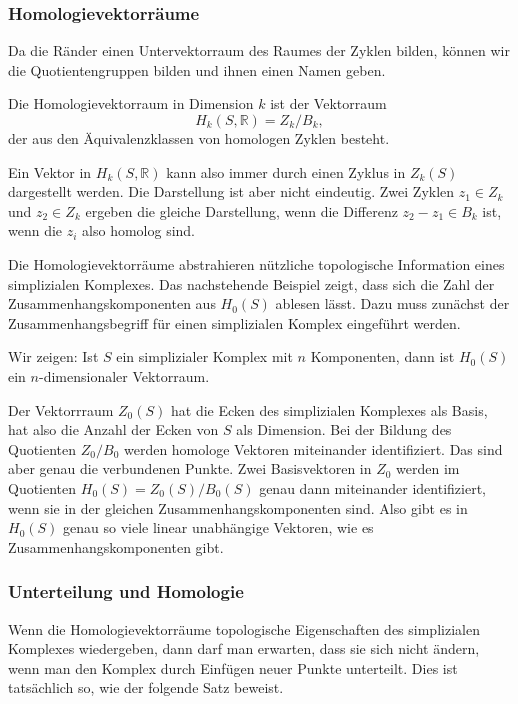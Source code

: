 %
%
\subsubsection{Homologievektorräume}
Da die Ränder einen Untervektorraum des Raumes der Zyklen bilden,
können wir die Quotientengruppen bilden und ihnen einen Namen geben.

\begin{definition}[Homologievektorraum]
Die Homologievektorraum in Dimension $k$ ist der Vektorraum
\[
H_k(S,\mathbb{R})
=
Z_k / B_k,
\]
der aus den Äquivalenzklassen von homologen Zyklen besteht.
\end{definition}

Ein Vektor in $H_k(S,\mathbb{R})$ kann also immer durch einen Zyklus
in $Z_k(S)$ dargestellt werden.
Die Darstellung ist aber nicht eindeutig.
Zwei Zyklen $z_1\in Z_k$ und $z_2\in Z_k$ ergeben die gleiche Darstellung,
wenn die Differenz $z_2-z_1\in B_k$ ist, wenn die $z_i$ also homolog sind.

Die Homologievektorräume abstrahieren nützliche topologische Information
eines simplizialen Komplexes.
Das nachstehende Beispiel zeigt, dass sich die Zahl der
Zusammenhangskomponenten aus $H_0(S)$ ablesen lässt.
Dazu muss zunächst der Zusammenhangsbegriff für einen simplizialen Komplex
eingeführt werden.

\begin{beispiel}
Wir zeigen: Ist $S$ ein simplizialer Komplex mit $n$ Komponenten, dann ist 
$H_0(S)$ ein $n$-dimensionaler Vektorraum.
\medskip

Der Vektorrraum $Z_0(S)$ hat die Ecken des simplizialen Komplexes als Basis,
hat also die Anzahl der Ecken von $S$ als Dimension.
Bei der Bildung des Quotienten $Z_0/B_0$ werden homologe Vektoren miteinander
identifiziert.
Das sind aber genau die verbundenen Punkte.
Zwei Basisvektoren in $Z_0$ werden im Quotienten $H_0(S)=Z_0(S)/B_0(S)$
genau dann miteinander identifiziert, wenn sie in der gleichen
Zusammenhangskomponenten sind.
Also gibt es in $H_0(S)$ genau so viele linear unabhängige Vektoren,
wie es Zusammenhangskomponenten gibt.
\end{beispiel}

%
%
\subsubsection{Unterteilung und Homologie}
Wenn die Homologievektorräume topologische Eigenschaften des simplizialen
Komplexes wiedergeben, dann darf man erwarten, dass sie sich nicht
ändern, wenn man den Komplex durch Einfügen neuer Punkte unterteilt.
Dies ist tatsächlich so, wie der folgende Satz beweist.

